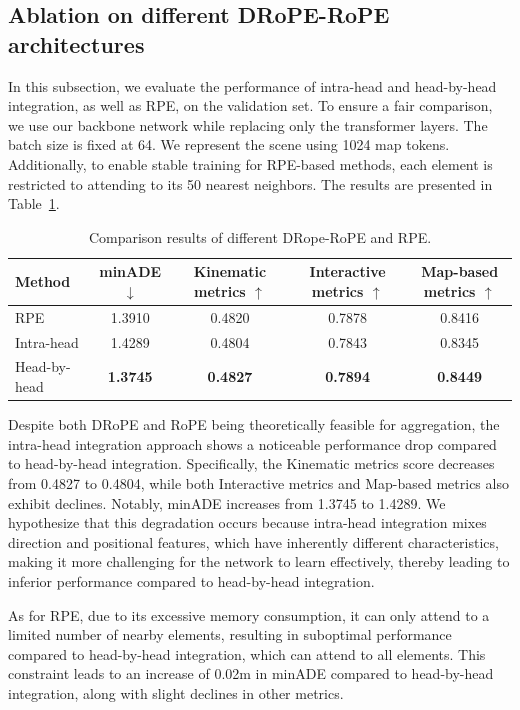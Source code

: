 \documentclass[lettersize,journal]{IEEEtran}
\theoremstyle{definition}
\begin{document}
\subsection{Ablation on different DRoPE-RoPE architectures}
\label{exp:different_rpe}
In this subsection, we evaluate the performance of intra-head and head-by-head integration, as well as RPE, on the validation set. To ensure a fair comparison, we use our backbone network while replacing only the transformer layers. The batch size is fixed at 64. We represent the scene using 1024 map tokens. Additionally, to enable stable training for RPE-based methods, each element is restricted to attending to its 50 nearest neighbors. The results are presented in Table~\ref{tab:ablation_study}.
\begin{table}[h]
\footnotesize
\setlength{\tabcolsep}{3pt}
\caption{Comparison results of different DRope-RoPE and RPE.}
\centering
\begin{tabular}{@{}lcccc@{}}
\toprule
Method       & minADE $\downarrow$ & \makecell[c]{Kinematic \\ metrics $\uparrow$} & \makecell[c]{Interactive \\ metrics $\uparrow$} & \makecell[c]{Map-based \\ metrics $\uparrow$} \\ \midrule
RPE          & 1.3910      & 0.4820      & 0.7878      & 0.8416 \\
Intra-head   & 1.4289 & 0.4804 & 0.7843 & 0.8345 \\
Head-by-head & \textbf{1.3745} & \textbf{0.4827} & \textbf{0.7894} & \textbf{0.8449} \\ \bottomrule
\end{tabular}
\label{tab:ablation_study}
\end{table}
Despite both DRoPE and RoPE being theoretically feasible for aggregation, the intra-head integration approach shows a noticeable performance drop compared to head-by-head integration. Specifically, the Kinematic metrics score decreases from 0.4827 to 0.4804, while both Interactive metrics and Map-based metrics also exhibit declines. Notably, minADE increases from 1.3745 to 1.4289. We hypothesize that this degradation occurs because intra-head integration mixes direction and positional features, which have inherently different characteristics, making it more challenging for the network to learn effectively, thereby leading to inferior performance compared to head-by-head integration.  

As for RPE, due to its excessive memory consumption, it can only attend to a limited number of nearby elements, resulting in suboptimal performance compared to head-by-head integration, which can attend to all elements. This constraint leads to an increase of 0.02m in minADE compared to head-by-head integration, along with slight declines in other metrics.
\end{document}
